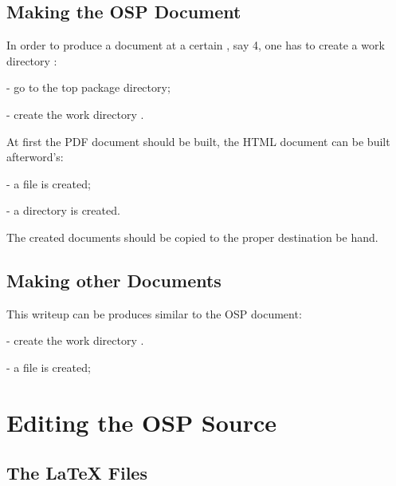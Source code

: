 \documentclass[12pt,letterpaper]{article}
\newcommand{\myil}[0]{{\color{red}{\em infolevel}}}
\begin{document}
\subsection{Making the OSP Document}
\label{sec:make}

  In order to produce a document%
   at a certain \myil{}, say {\color{red}4},
  one has to create a work directory :
  \begin{list}{}{\setlength{\itemsep}{-0.15cm}}
    \item {} - go to the top package directory;
    \item {} - create the work directory .
  \end{list}

  At first the PDF document should be built, the HTML document 
  can be built afterword's:
  \begin{list}{}{\setlength{\itemsep}{-0.15cm}}
    \item {} 
    \item {} - a file  is created;
    \item {} - a directory  is created.
  \end{list}
  The created documents should be copied to the proper
  destination be hand.

\subsection{Making other Documents}
\label{sec:makeother}

  This writeup can be produces similar to the OSP document:
  \begin{list}{}{\setlength{\itemsep}{-0.15cm}}
    \item {} - create the work directory .
    \item {} 
    \item {} - a file  is created;
  \end{list}
 
\section{Editing the OSP Source}
\label{sec:edit}

\subsection{The \LaTeX{} Files}
\label{sec:latexfiles}
\end{document}
